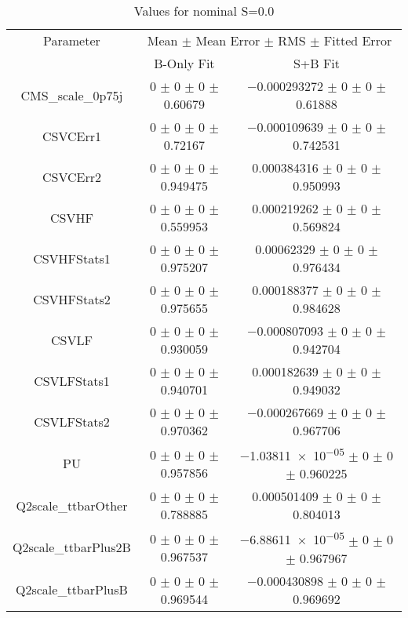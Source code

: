 \begin{table}
\centering
\caption{Values for nominal S=0.0}
\begin{tabular}{ccc}
\toprule
Parameter & \multicolumn{2}{c}{Mean $\pm$ Mean Error $\pm$ RMS $\pm$ Fitted Error}\\
 & B-Only Fit & S+B Fit\\
\midrule
CMS\_scale\_0p75j & \num{0} $\pm$ \num{0} $\pm$ \num{0} $\pm$ \num{0.60679} & \num{-0.000293272} $\pm$ \num{0} $\pm$ \num{0} $\pm$ \num{0.61888}\\
CSVCErr1 & \num{0} $\pm$ \num{0} $\pm$ \num{0} $\pm$ \num{0.72167} & \num{-0.000109639} $\pm$ \num{0} $\pm$ \num{0} $\pm$ \num{0.742531}\\
CSVCErr2 & \num{0} $\pm$ \num{0} $\pm$ \num{0} $\pm$ \num{0.949475} & \num{0.000384316} $\pm$ \num{0} $\pm$ \num{0} $\pm$ \num{0.950993}\\
CSVHF & \num{0} $\pm$ \num{0} $\pm$ \num{0} $\pm$ \num{0.559953} & \num{0.000219262} $\pm$ \num{0} $\pm$ \num{0} $\pm$ \num{0.569824}\\
CSVHFStats1 & \num{0} $\pm$ \num{0} $\pm$ \num{0} $\pm$ \num{0.975207} & \num{0.00062329} $\pm$ \num{0} $\pm$ \num{0} $\pm$ \num{0.976434}\\
CSVHFStats2 & \num{0} $\pm$ \num{0} $\pm$ \num{0} $\pm$ \num{0.975655} & \num{0.000188377} $\pm$ \num{0} $\pm$ \num{0} $\pm$ \num{0.984628}\\
CSVLF & \num{0} $\pm$ \num{0} $\pm$ \num{0} $\pm$ \num{0.930059} & \num{-0.000807093} $\pm$ \num{0} $\pm$ \num{0} $\pm$ \num{0.942704}\\
CSVLFStats1 & \num{0} $\pm$ \num{0} $\pm$ \num{0} $\pm$ \num{0.940701} & \num{0.000182639} $\pm$ \num{0} $\pm$ \num{0} $\pm$ \num{0.949032}\\
CSVLFStats2 & \num{0} $\pm$ \num{0} $\pm$ \num{0} $\pm$ \num{0.970362} & \num{-0.000267669} $\pm$ \num{0} $\pm$ \num{0} $\pm$ \num{0.967706}\\
PU & \num{0} $\pm$ \num{0} $\pm$ \num{0} $\pm$ \num{0.957856} & \num{-1.03811e-05} $\pm$ \num{0} $\pm$ \num{0} $\pm$ \num{0.960225}\\
Q2scale\_ttbarOther & \num{0} $\pm$ \num{0} $\pm$ \num{0} $\pm$ \num{0.788885} & \num{0.000501409} $\pm$ \num{0} $\pm$ \num{0} $\pm$ \num{0.804013}\\
Q2scale\_ttbarPlus2B & \num{0} $\pm$ \num{0} $\pm$ \num{0} $\pm$ \num{0.967537} & \num{-6.88611e-05} $\pm$ \num{0} $\pm$ \num{0} $\pm$ \num{0.967967}\\
Q2scale\_ttbarPlusB & \num{0} $\pm$ \num{0} $\pm$ \num{0} $\pm$ \num{0.969544} & \num{-0.000430898} $\pm$ \num{0} $\pm$ \num{0} $\pm$ \num{0.969692}\\

\end{tabular}
\end{table}

